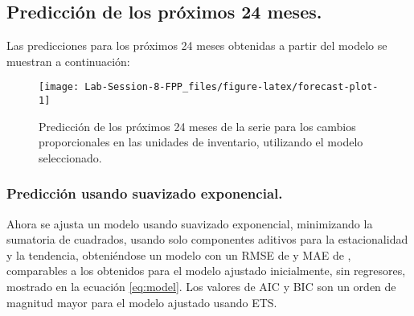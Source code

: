 \documentclass[]{article}
\newenvironment{Shaded}{\begin{snugshade}}{\end{snugshade}}
\newcommand{\DataTypeTok}[1]{\textcolor[rgb]{0.13,0.29,0.53}{#1}}
\newcommand{\DecValTok}[1]{\textcolor[rgb]{0.00,0.00,0.81}{#1}}
\newcommand{\KeywordTok}[1]{\textcolor[rgb]{0.13,0.29,0.53}{\textbf{#1}}}
\newcommand{\NormalTok}[1]{#1}
\newcommand{\OperatorTok}[1]{\textcolor[rgb]{0.81,0.36,0.00}{\textbf{#1}}}
\newcommand{\StringTok}[1]{\textcolor[rgb]{0.31,0.60,0.02}{#1}}
\begin{document}
\hypertarget{predicciuxf3n-de-los-pruxf3ximos-24-meses.}{%
\subsection{Predicción de los próximos 24 meses.}\label{predicciuxf3n-de-los-pruxf3ximos-24-meses.}}

Las predicciones para los próximos 24 meses obtenidas a partir del modelo se muestran a continuación:

\begin{Shaded}
\end{Shaded}

\begin{figure}[!h]

{\centering \texttt{[image: Lab-Session-8-FPP\_files/figure-latex/forecast-plot-1]} 

}

\caption{Predicción de los próximos 24 meses de la serie para los cambios proporcionales en las unidades de inventario, utilizando el modelo seleccionado.}\label{fig:forecast-plot}
\end{figure}

\hypertarget{predicciuxf3n-usando-suavizado-exponencial.}{%
\subsubsection{Predicción usando suavizado exponencial.}\label{predicciuxf3n-usando-suavizado-exponencial.}}

Ahora se ajusta un modelo usando suavizado exponencial, minimizando la sumatoria de cuadrados, usando solo componentes aditivos para la estacionalidad y la tendencia, obteniéndose un modelo con un RMSE de  y MAE de , comparables a los obtenidos para el modelo ajustado inicialmente, sin regresores, mostrado en la ecuación \eqref{eq:model}.
Los valores de AIC y BIC son un orden de magnitud mayor para el modelo ajustado usando ETS.
\end{document}
